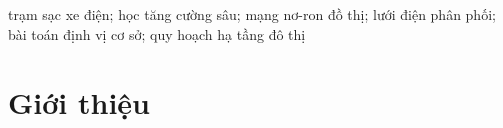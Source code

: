 \documentclass[10pt, conference, a4paper, compsocconf]{IEEEtran}
\begin{document}
\begin{IEEEkeywords}
trạm sạc xe điện; học tăng cường sâu; mạng nơ-ron đồ thị; lưới điện phân phối;
bài toán định vị cơ sở; quy hoạch hạ tầng đô thị
\end{IEEEkeywords}

\IEEEpeerreviewmaketitle

\section{Giới thiệu}
%
%
%
%
%

\end{document}
